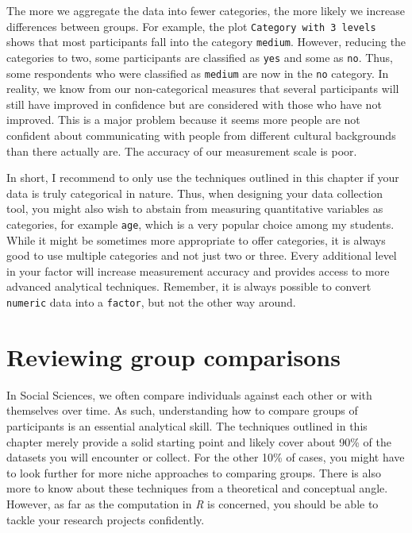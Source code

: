 \documentclass[
  letterpaper,
]{krantz}
\begin{document}
The more we aggregate the data into fewer categories, the more likely we
increase differences between groups. For example, the plot
\texttt{Category\ with\ 3\ levels} shows that most participants fall
into the category \texttt{medium}. However, reducing the categories to
two, some participants are classified as \texttt{yes} and some as
\texttt{no}. Thus, some respondents who were classified as
\texttt{medium} are now in the \texttt{no} category. In reality, we know
from our non-categorical measures that several participants will still
have improved in confidence but are considered with those who have not
improved. This is a major problem because it seems more people are not
confident about communicating with people from different cultural
backgrounds than there actually are. The accuracy of our measurement
scale is poor.

In short, I recommend to only use the techniques outlined in this
chapter if your data is truly categorical in nature. Thus, when
designing your data collection tool, you might also wish to abstain from
measuring quantitative variables as categories, for example
\texttt{age}, which is a very popular choice among my students. While it
might be sometimes more appropriate to offer categories, it is always
good to use multiple categories and not just two or three. Every
additional level in your factor will increase measurement accuracy and
provides access to more advanced analytical techniques. Remember, it is
always possible to convert \texttt{numeric} data into a \texttt{factor},
but not the other way around.

\section{Reviewing group
comparisons}\label{sec-reviewing-group-comparisons}

In Social Sciences, we often compare individuals against each other or
with themselves over time. As such, understanding how to compare groups
of participants is an essential analytical skill. The techniques
outlined in this chapter merely provide a solid starting point and
likely cover about 90\% of the datasets you will encounter or collect.
For the other 10\% of cases, you might have to look further for more
niche approaches to comparing groups. There is also more to know about
these techniques from a theoretical and conceptual angle. However, as
far as the computation in \emph{R} is concerned, you should be able to
tackle your research projects confidently.
\end{document}
